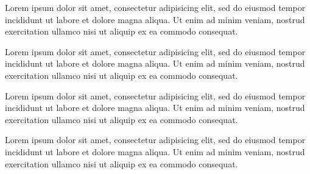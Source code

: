 \documentclass{book}
\begin{document}
\begin{pages}
\begin{Leftside}
\pstart
\begin{ledgroup}

Lorem ipsum dolor sit amet, consectetur adipisicing elit, sed do eiusmod tempor incididunt ut labore et dolore magna aliqua. Ut enim ad minim veniam, nostrud exercitation ullamco  nisi ut aliquip ex ea commodo consequat. 
\end{ledgroup}
\pend


\pstart
\begin{ledgroup}

Lorem ipsum dolor sit amet, consectetur adipisicing elit, sed do eiusmod tempor incididunt ut labore et dolore magna aliqua. Ut enim ad minim veniam, nostrud exercitation ullamco  nisi ut aliquip ex ea commodo consequat. 

\end{ledgroup}
\pend

\pstart
\begin{ledgroup}

Lorem ipsum dolor sit amet, consectetur adipisicing elit, sed do eiusmod tempor incididunt ut labore et dolore magna aliqua. Ut enim ad minim veniam, nostrud exercitation ullamco  nisi ut aliquip ex ea commodo consequat. 

\end{ledgroup}
\pend
\pstart
\begin{ledgroup}

Lorem ipsum dolor sit amet, consectetur adipisicing elit, sed do eiusmod tempor incididunt ut labore et dolore magna aliqua. Ut enim ad minim veniam, nostrud exercitation ullamco  nisi ut aliquip ex ea commodo consequat. 

\end{ledgroup}
\pend

\pstart
\begin{ledgroup}


\end{ledgroup}
\end{Leftside}
\end{pages}
\end{document}

